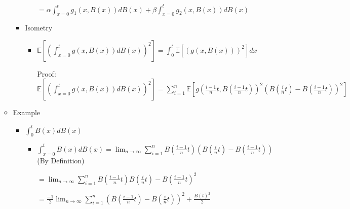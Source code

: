 \documentclass[a4paper]{article}
\begin{document}
\begin{itemize}
\begin{itemize}
\begin{itemize}
\begin{itemize}
                                $= \alpha \int_{x=0}^t g_1(x, B(x)) dB(x) + \beta \int_{x=0}^t g_2(x, B(x)) dB(x)$
                        \end{itemize}
                    \item Isometry
                        \begin{itemize}
                            \item $\mathbb{E}[(\int_{x=0}^t g(x, B(x)) dB(x))^2] = \int_0^t \mathbb{E}[(g(x, B(x)) )^2] dx$

                                Proof: $\mathbb{E}[(\int_{x=0}^t g(x, B(x)) dB(x))^2] = \sum_{i=1}^n \mathbb{E}[ g(\frac{i-1}{n}t, B(\frac{i-1}{n}t))^2 (B(\frac{i}{n}t) - B(\frac{i-1}{n}t))^2]$
                        \end{itemize}
                \end{itemize}
            \item Example
                \begin{itemize}
                    \item $\int_0^t B(x) d B(x)$
                        \begin{itemize}
                            \item $\int_{x=0}^t B(x) dB(x) = \lim_{n \rightarrow \infty} \sum_{i=1}^n B(\frac{i-1}{n}t) (B(\frac{i}{n}t) - B(\frac{i-1}{n}t))$ (By Definition)

                            $= \lim_{n \rightarrow \infty} \sum_{i=1}^n B(\frac{i-1}{n}t) B(\frac{i}{n}t) - B(\frac{i-1}{n}t)^2$

                            $= \frac{-1}{2} \lim_{n \rightarrow \infty} \sum_{i=1}^n (B(\frac{i-1}{n}t) - B(\frac{i}{n}t))^2 + \frac{B(t)^2}{2}$


\end{itemize}
\end{itemize}
\end{itemize}
\end{itemize}
\end{document}
